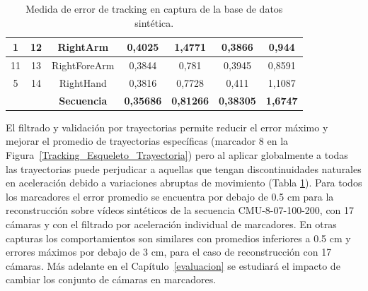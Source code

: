 \begin{table}[ht!]
{\begin{tabular}{|c|c|c|c|c|c|c|}
1        & 12        & RightArm           & 0,4025                                                       & 1,4771                                                       & 0,3866                                                                  & 0,944                                                                   \\ \hline
11       & 13        & RightForeArm       & 0,3844                                                       & 0,781                                                        & 0,3945                                                                  & 0,8591                                                                  \\ \hline
5        & 14        & RightHand          & 0,3816                                                       & 0,7728                                                       & 0,411                                                                   & 1,1087                                                                  \\ \hline
         &           & \textbf{Secuencia} & \textbf{0,35686}                                             & \textbf{0,81266}                                             & \textbf{0,38305}                                                        & \textbf{1,6747}                                                         \\ \hline
\end{tabular}
}
\caption{Medida de error de tracking en captura de la base de datos sintética.}
\label{tablaerrortrack}
\end{table}



El filtrado y validación por trayectorias permite reducir el error máximo y mejorar el promedio de trayectorias específicas (marcador 8 en la Figura~\ref{Tracking_Esqueleto_Trayectoria}) pero al aplicar globalmente a todas las trayectorias puede perjudicar a aquellas que tengan discontinuidades naturales en aceleración debido a variaciones abruptas de movimiento (Tabla \ref{tablaerrortrack}). Para todos los marcadores el error promedio se encuentra por debajo de 0.5 cm para la reconstrucción sobre vídeos sintéticos de la secuencia CMU-8-07-100-200, con 17 cámaras y con el filtrado por aceleración individual de marcadores. En otras capturas los comportamientos son similares con promedios inferiores a 0.5 cm y errores máximos por debajo de 3 cm, para el caso de reconstrucción con 17 cámaras. Más adelante en el Capítulo~\ref{evaluacion} se estudiará el impacto de cambiar los conjunto de cámaras en marcadores.   


